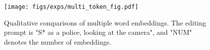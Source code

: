 \begin{figure}[htb]
  \centering
  \texttt{[image: figs/exps/multi\_token\_fig.pdf]}
  \caption{Qualitative comparisons of multiple word embeddings. The editing prompt is "S* as a police, looking at the camera", and "NUM" denotes the number of embeddings.}
  \label{fig:multi_token}
\end{figure}
